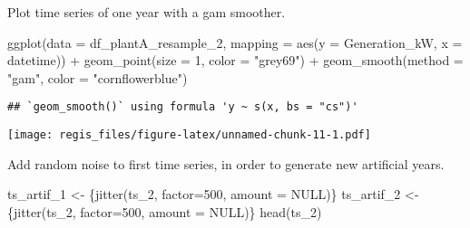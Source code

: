 \documentclass[
]{article}
\newenvironment{Shaded}{\begin{snugshade}}{\end{snugshade}}
\newcommand{\AttributeTok}[1]{\textcolor[rgb]{0.77,0.63,0.00}{#1}}
\newcommand{\ConstantTok}[1]{\textcolor[rgb]{0.00,0.00,0.00}{#1}}
\newcommand{\DecValTok}[1]{\textcolor[rgb]{0.00,0.00,0.81}{#1}}
\newcommand{\FunctionTok}[1]{\textcolor[rgb]{0.00,0.00,0.00}{#1}}
\newcommand{\NormalTok}[1]{#1}
\newcommand{\OtherTok}[1]{\textcolor[rgb]{0.56,0.35,0.01}{#1}}
\newcommand{\SpecialCharTok}[1]{\textcolor[rgb]{0.00,0.00,0.00}{#1}}
\newcommand{\StringTok}[1]{\textcolor[rgb]{0.31,0.60,0.02}{#1}}
\begin{document}
\begin{Shaded}
\end{Shaded}

Plot time series of one year with a gam smoother.

\begin{Shaded}
\begin{Highlighting}[]
\FunctionTok{ggplot}\NormalTok{(}\AttributeTok{data =}\NormalTok{ df\_plantA\_resample\_2,}
  \AttributeTok{mapping =} \FunctionTok{aes}\NormalTok{(}\AttributeTok{y =}\NormalTok{ Generation\_kW, }\AttributeTok{x =}\NormalTok{ datetime)) }\SpecialCharTok{+}
  \FunctionTok{geom\_point}\NormalTok{(}\AttributeTok{size =} \DecValTok{1}\NormalTok{, }\AttributeTok{color =} \StringTok{"grey69"}\NormalTok{) }\SpecialCharTok{+}
  \FunctionTok{geom\_smooth}\NormalTok{(}\AttributeTok{method =} \StringTok{"gam"}\NormalTok{, }\AttributeTok{color =} \StringTok{"cornflowerblue"}\NormalTok{)}
\end{Highlighting}
\end{Shaded}

\begin{verbatim}
## `geom_smooth()` using formula 'y ~ s(x, bs = "cs")'
\end{verbatim}

\texttt{[image: regis\_files/figure-latex/unnamed-chunk-11-1.pdf]}

Add random noise to first time series, in order to generate new
artificial years.

\begin{Shaded}
\begin{Highlighting}[]
\NormalTok{ts\_artif\_1 }\OtherTok{\textless{}{-}}\NormalTok{ \{}\FunctionTok{jitter}\NormalTok{(ts\_2, }\AttributeTok{factor=}\DecValTok{500}\NormalTok{, }\AttributeTok{amount =} \ConstantTok{NULL}\NormalTok{)\}}
\NormalTok{ts\_artif\_2 }\OtherTok{\textless{}{-}}\NormalTok{ \{}\FunctionTok{jitter}\NormalTok{(ts\_2, }\AttributeTok{factor=}\DecValTok{500}\NormalTok{, }\AttributeTok{amount =} \ConstantTok{NULL}\NormalTok{)\}}
\FunctionTok{head}\NormalTok{(ts\_2)}
\end{Highlighting}
\end{Shaded}
\end{document}
